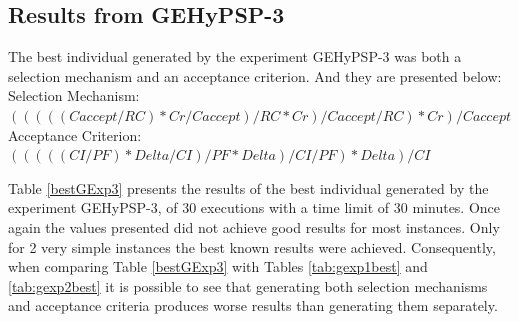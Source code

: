 \documentclass[conference]{IEEEtran}
\begin{document}
\begin{table}[]
	\centering
	\caption{Results from the best individual found in GEHyPSP-2
		}
	\label{tab:gexp2best}
\end{table}

\subsection{Results from GEHyPSP-3}

The best individual generated by the experiment GEHyPSP-3 was both a selection mechanism and an acceptance criterion. And they are presented below: \\ 
Selection Mechanism: $( ( ( ( ( Caccept / RC ) * Cr / Caccept ) / RC * Cr ) / Caccept / RC ) * Cr ) / Caccept$ \\
Acceptance Criterion: $( ( ( ( ( CI / PF ) * Delta / CI ) / PF * Delta ) / CI / PF ) * Delta ) / CI$

Table \ref{bestGExp3} presents the results of the best individual generated by the experiment GEHyPSP-3, of 30 executions with a time limit of 30 minutes. Once again the values presented did not achieve good results for most instances. Only for 2 very simple instances the best known results were achieved. Consequently, when comparing Table \ref{bestGExp3} with Tables \ref{tab:gexp1best} and \ref{tab:gexp2best} it is possible to see that generating both selection mechanisms and acceptance criteria produces worse results than generating them separately.
\end{document}
